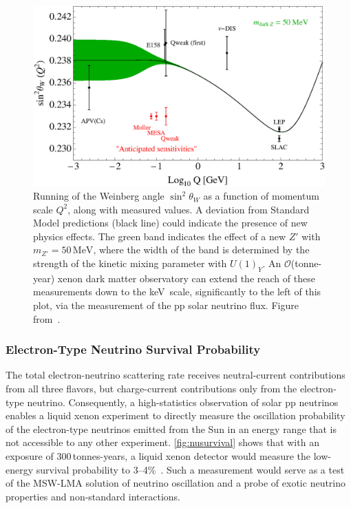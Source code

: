 \begin{figure}[!htbp]
    \centering
    \includegraphics[width=\columnwidth]{fig_running_weinberg_50.eps}
    \caption{Running of the Weinberg angle $\sin^2 \theta_W$ as a function of momentum scale $Q^2$, along with measured values. A deviation from Standard Model predictions (black line) could indicate the presence of new physics effects. The green band indicates the effect of a new $Z'$ with $m_{Z'} = 50 \,\textrm{MeV}$, where the width of the band is determined by the strength of the kinetic mixing parameter with $U(1)_Y$. An $\mathcal{O}$(tonne-year) xenon dark matter observatory can extend the reach of these measurements down to the keV~scale, significantly to the left of this plot, via the measurement of the pp solar neutrino flux. Figure from~\cite{Davoudiasl:2014kua}.}
    \label{fig:weinberg}
\end{figure}

\subsubsection{Electron-Type Neutrino Survival Probability}

The total electron-neutrino scattering rate receives neutral-current contributions from all three flavors, but charge-current contributions only from the electron-type neutrino. Consequently, a high-statistics observation of solar pp neutrinos enables a liquid xenon experiment to directly measure the oscillation probability of the electron-type neutrinos emitted from the Sun in an energy range that is not accessible to any other experiment. \autoref{fig:nusurvival} shows that with an exposure of 300\,tonnes-years, a liquid xenon detector would measure the low-energy survival probability to 3--4\%~\cite{Aalbers:2020gsn}. Such a measurement would serve as a test of the MSW-LMA solution of neutrino oscillation and a probe of exotic neutrino properties and non-standard interactions.

